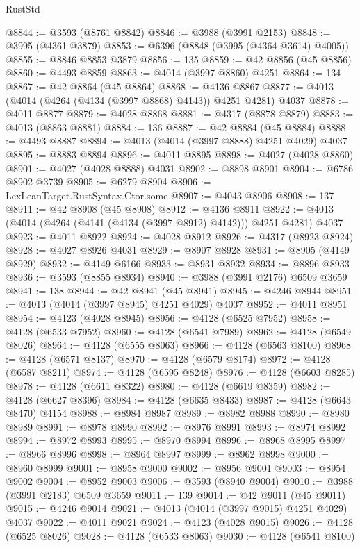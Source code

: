\begin{lexlean}{RustStd}
\begin{coremodule}
@8844 := @3593 (@8761 @8842)
@8846 := @3988 (@3991 @2153)
@8848 := @3995 (@4361 @3879)
@8853 := @6396 (@8848 (@3995 (@4364 @3614) @4005))
@8855 := @8846 @8853 @3879
@8856 := 135
@8859 := @42 @8856 (@45 @8856)
@8860 := @4493 @8859
@8863 := @4014 (@3997 @8860) @4251
@8864 := 134
@8867 := @42 @8864 (@45 @8864)
@8868 := @4136 @8867
@8877 := @4013 (@4014 (@4264 (@4134 (@3997 @8868) @4143)) @4251 @4281) @4037
@8878 := @4011 @8877
@8879 := @4028 @8868
@8881 := @4317 (@8878 @8879)
@8883 := @4013 (@8863 @8881)
@8884 := 136
@8887 := @42 @8884 (@45 @8884)
@8888 := @4493 @8887
@8894 := @4013 (@4014 (@3997 @8888) @4251 @4029) @4037
@8895 := @8883 @8894
@8896 := @4011 @8895
@8898 := @4027 (@4028 @8860)
@8901 := @4027 (@4028 @8888) @4031
@8902 := @8898 @8901
@8904 := @6786 @8902 @3739
@8905 := @6279 @8904
@8906 := LexLeanTarget.RustSyntax.Ctor.some
@8907 := @4043 @8906
@8908 := 137
@8911 := @42 @8908 (@45 @8908)
@8912 := @4136 @8911
@8922 := @4013 (@4014 (@4264 (@4141 (@4134 (@3997 @8912) @4142))) @4251 @4281) @4037
@8923 := @4011 @8922
@8924 := @4028 @8912
@8926 := @4317 (@8923 @8924)
@8928 := @4027 @8926 @4031
@8929 := @8907 @8928
@8931 := @8905 (@4149 @8929)
@8932 := @4149 @6166
@8933 := @8931 @8932
@8934 := @8896 @8933
@8936 := @3593 (@8855 @8934)
@8940 := @3988 (@3991 @2176) @6509 @3659
@8941 := 138
@8944 := @42 @8941 (@45 @8941)
@8945 := @4246 @8944
@8951 := @4013 (@4014 (@3997 @8945) @4251 @4029) @4037
@8952 := @4011 @8951
@8954 := @4123 (@4028 @8945)
@8956 := @4128 (@6525 @7952)
@8958 := @4128 (@6533 @7952)
@8960 := @4128 (@6541 @7989)
@8962 := @4128 (@6549 @8026)
@8964 := @4128 (@6555 @8063)
@8966 := @4128 (@6563 @8100)
@8968 := @4128 (@6571 @8137)
@8970 := @4128 (@6579 @8174)
@8972 := @4128 (@6587 @8211)
@8974 := @4128 (@6595 @8248)
@8976 := @4128 (@6603 @8285)
@8978 := @4128 (@6611 @8322)
@8980 := @4128 (@6619 @8359)
@8982 := @4128 (@6627 @8396)
@8984 := @4128 (@6635 @8433)
@8987 := @4128 (@6643 @8470) @4154
@8988 := @8984 @8987
@8989 := @8982 @8988
@8990 := @8980 @8989
@8991 := @8978 @8990
@8992 := @8976 @8991
@8993 := @8974 @8992
@8994 := @8972 @8993
@8995 := @8970 @8994
@8996 := @8968 @8995
@8997 := @8966 @8996
@8998 := @8964 @8997
@8999 := @8962 @8998
@9000 := @8960 @8999
@9001 := @8958 @9000
@9002 := @8956 @9001
@9003 := @8954 @9002
@9004 := @8952 @9003
@9006 := @3593 (@8940 @9004)
@9010 := @3988 (@3991 @2183) @6509 @3659
@9011 := 139
@9014 := @42 @9011 (@45 @9011)
@9015 := @4246 @9014
@9021 := @4013 (@4014 (@3997 @9015) @4251 @4029) @4037
@9022 := @4011 @9021
@9024 := @4123 (@4028 @9015)
@9026 := @4128 (@6525 @8026)
@9028 := @4128 (@6533 @8063)
@9030 := @4128 (@6541 @8100)

\end{coremodule}
\end{lexlean}
